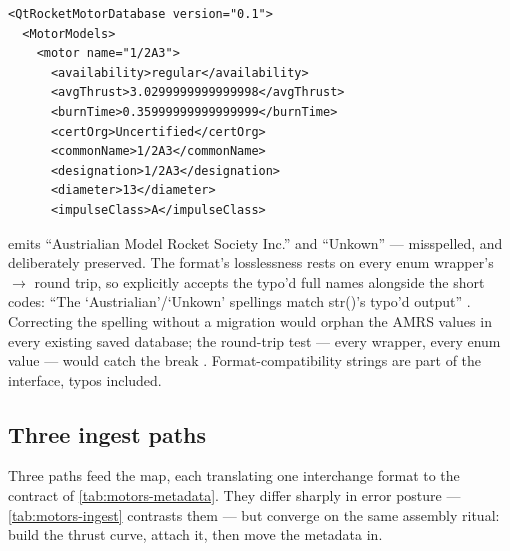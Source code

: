 \begin{listing}[htbp]
\begin{verbatim}
<QtRocketMotorDatabase version="0.1">
  <MotorModels>
    <motor name="1/2A3">
      <availability>regular</availability>
      <avgThrust>3.0299999999999998</avgThrust>
      <burnTime>0.35999999999999999</burnTime>
      <certOrg>Uncertified</certOrg>
      <commonName>1/2A3</commonName>
      <designation>1/2A3</designation>
      <diameter>13</diameter>
      <impulseClass>A</impulseClass>
\end{verbatim}
\caption{Opening of the committed  fixture
. Enums travel as their 
strings, numerics at . Note the 1/2A3 motor carrying
 --- the server-verbatim class discussed in
\cref{sec:motors-class}.}\label{lst:motors-qmd}
\end{listing}

\begin{keyinsight}
 emits ``Austrialian Model Rocket Society Inc.''
 and ``Unkown''  --- misspelled,
and deliberately preserved. The  format's losslessness rests on every enum
wrapper's $\to$ round trip, so  explicitly
accepts the typo'd full names alongside the short codes: ``The `Austrialian'/`Unkown'
spellings match str()'s typo'd output'' . Correcting the
spelling without a migration would orphan the AMRS values in every existing saved
database; the round-trip test --- every wrapper, every enum value --- would catch the
break . Format-compatibility strings
are part of the interface, typos included.
\end{keyinsight}

\subsection{Three ingest paths}\label{sec:motors-ingest}

Three paths feed the map, each translating one interchange format to the 
contract of \cref{tab:motors-metadata}. They differ sharply in error posture ---
\cref{tab:motors-ingest} contrasts them --- but converge on the same assembly ritual:
build the thrust curve, attach it, then move the metadata in.

